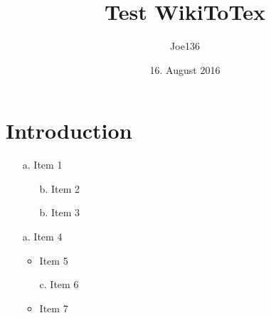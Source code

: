 \documentclass{article}
\title{Test WikiToTex}
\author{Joe136}
\date{16. August 2016}
\newcommand{\wikilist}[1]{\iffalse #1 \fi}
\begin{document}
\maketitle


\chapter{Introduction}

\wikilist{
- Item 1
-- Item 2
-- Item 3
- Item 4
-- Item 5
-- Item 6
-- Item 7
}
\begin{itemize}
   \item[a.] Item 1
   \begin{itemize}[itemindent=-0.4cm]
      \item[b.] Item 2
      \item[b.] Item 3
   \end{itemize}
   \item[a.] Item 4
   \begin{itemize}[itemindent=-0.4cm]
      \item Item 5
      \item[c.] Item 6
      \item Item 7
   \end{itemize}
\end{itemize}



\end{document}
